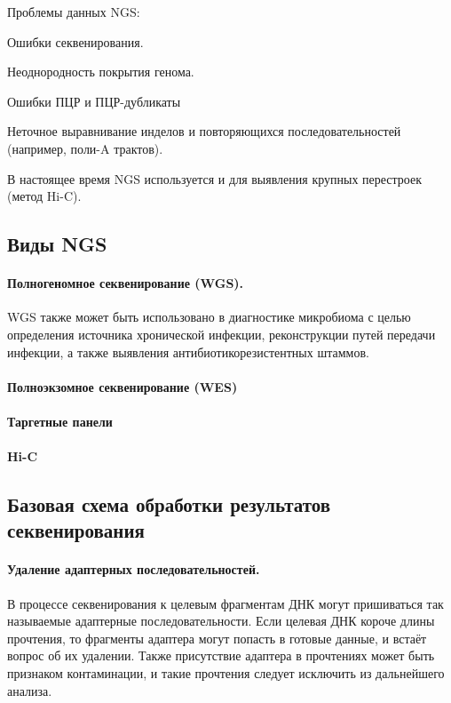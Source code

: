 \documentclass[a4paper,12pt]{article}
\begin{document}
Проблемы данных NGS:

Ошибки секвенирования.

Неоднородность покрытия генома.

Ошибки ПЦР и ПЦР-дубликаты

Неточное выравнивание инделов и повторяющихся последовательностей (например, поли-A трактов).

В настоящее время NGS используется и для выявления крупных перестроек (метод Hi-C).

\subsection{Виды NGS}

\paragraph{Полногеномное секвенирование (WGS).}

WGS также может быть использовано в диагностике микробиома с целью определения источника хронической инфекции, реконструкции путей передачи инфекции, а также выявления антибиотикорезистентных штаммов\cite{balloux}.

\paragraph{Полноэкзомное секвенирование (WES)}

\paragraph{Таргетные панели}

\paragraph{Hi-C}

\subsection{Базовая схема обработки результатов секвенирования}

\paragraph{Удаление адаптерных последовательностей.}
В процессе секвенирования к целевым фрагментам ДНК могут пришиваться так называемые адаптерные последовательности.
Если целевая ДНК короче длины прочтения, то фрагменты адаптера могут попасть в готовые данные, и встаёт вопрос об их удалении.
Также присутствие адаптера в прочтениях может быть признаком контаминации, и такие прочтения следует исключить из дальнейшего анализа\cite{cutadapt}.
\end{document}
